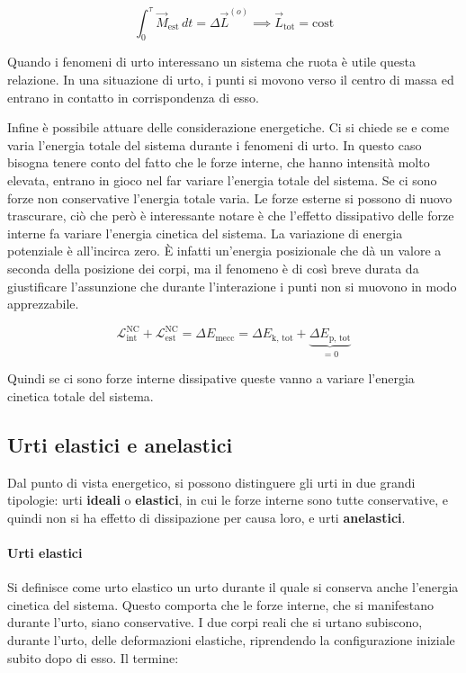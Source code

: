 \[
	\int_0^\tau \vec{M}_\text{est}\,dt=\Delta \vec{L}^{(o)} \implies \vec{L}_\text{tot}=\text{cost}
\]

Quando i fenomeni di urto interessano un sistema che ruota è utile questa relazione. In una situazione di urto, i punti si movono verso il centro di massa ed entrano in contatto in corrispondenza di esso.

Infine è possibile attuare delle considerazione energetiche. Ci si chiede se e come varia l'energia totale del sistema durante i fenomeni di urto. In questo caso bisogna tenere conto del fatto che le forze interne, che hanno intensità molto elevata, entrano in gioco nel far variare l'energia totale del sistema. Se ci sono forze non conservative l'energia totale varia. Le forze esterne si possono di nuovo trascurare, ciò che però è interessante notare è che l'effetto dissipativo delle forze interne fa variare l'energia cinetica del sistema. La variazione di energia potenziale è all'incirca zero. È infatti un'energia posizionale che dà un valore a seconda della posizione dei corpi, ma il fenomeno è di così breve durata da giustificare l'assunzione che durante l'interazione i punti non si muovono in modo apprezzabile.

\[
	\mathcal{L}_\text{int}^\text{NC}+\mathcal{L}_\text{est}^\text{NC}=\Delta E_\text{mecc}=\Delta E_\text{k, tot}+\underbrace{\Delta E_\text{p, tot}}_{=0}
\]

Quindi se ci sono forze interne dissipative queste vanno a variare l'energia cinetica totale del sistema.

\subsection{Urti elastici e anelastici}

Dal punto di vista energetico, si possono distinguere gli urti in due grandi tipologie: urti \textbf{ideali} o \textbf{elastici}, in cui le forze interne sono tutte conservative, e quindi non si ha effetto di dissipazione per causa loro, e urti \textbf{anelastici}.

\paragraph{Urti elastici} Si definisce come urto elastico un urto durante il quale si conserva anche l'energia cinetica del sistema. Questo comporta che le forze interne, che si manifestano durante l'urto, siano conservative. I due corpi reali che si urtano subiscono, durante l'urto, delle deformazioni elastiche, riprendendo la configurazione iniziale subito dopo di esso.
Il termine:

